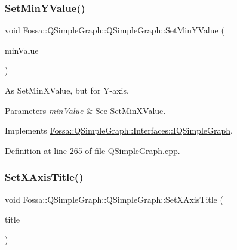 \subsubsection{\texorpdfstring{Set\+Min\+Y\+Value()}{SetMinYValue()}}
{\footnotesize\ttfamily void Fossa\+::\+Q\+Simple\+Graph\+::\+Q\+Simple\+Graph\+::\+Set\+Min\+Y\+Value (\begin{DoxyParamCaption}\item[{double}]{min\+Value }\end{DoxyParamCaption})\hspace{0.3cm}{\ttfamily [virtual]}}



As Set\+Min\+X\+Value, but for Y-\/axis. 


\begin{DoxyParams}{Parameters}
{\em min\+Value} & See Set\+Min\+X\+Value. \\
\hline
\end{DoxyParams}


Implements \hyperlink{class_fossa_1_1_q_simple_graph_1_1_interfaces_1_1_i_q_simple_graph_a3fdd1f6b538e2dfbf4a0140acd6b6e94}{Fossa\+::\+Q\+Simple\+Graph\+::\+Interfaces\+::\+I\+Q\+Simple\+Graph}.



Definition at line 265 of file Q\+Simple\+Graph.\+cpp.

\mbox{\label{class_fossa_1_1_q_simple_graph_1_1_q_simple_graph_a7579da572b54d43ccec3d2bd572b6cfa}} 
\subsubsection{\texorpdfstring{Set\+X\+Axis\+Title()}{SetXAxisTitle()}}
{\footnotesize\ttfamily void Fossa\+::\+Q\+Simple\+Graph\+::\+Q\+Simple\+Graph\+::\+Set\+X\+Axis\+Title (\begin{DoxyParamCaption}\item[{Q\+String}]{title }\end{DoxyParamCaption})\hspace{0.3cm}{\ttfamily [virtual]}}



